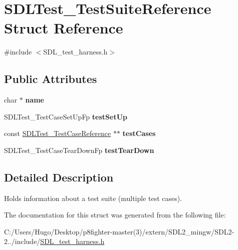 \hypertarget{struct_s_d_l_test___test_suite_reference}{}\section{S\+D\+L\+Test\+\_\+\+Test\+Suite\+Reference Struct Reference}
\label{struct_s_d_l_test___test_suite_reference}


{\ttfamily \#include $<$S\+D\+L\+\_\+test\+\_\+harness.\+h$>$}

\subsection*{Public Attributes}
\begin{DoxyCompactItemize}
\item 
\mbox{\label{struct_s_d_l_test___test_suite_reference_a8b002d932f91b321b384e59ae17f8f39}} 
char $\ast$ {\bfseries name}
\item 
\mbox{\label{struct_s_d_l_test___test_suite_reference_a8aa788b982efb93c93c2ab01202e0007}} 
S\+D\+L\+Test\+\_\+\+Test\+Case\+Set\+Up\+Fp {\bfseries test\+Set\+Up}
\item 
\mbox{\label{struct_s_d_l_test___test_suite_reference_a06d97ce5bcf9ceb1300cc4aa39c028d3}} 
const \hyperlink{struct_s_d_l_test___test_case_reference}{S\+D\+L\+Test\+\_\+\+Test\+Case\+Reference} $\ast$$\ast$ {\bfseries test\+Cases}
\item 
\mbox{\label{struct_s_d_l_test___test_suite_reference_ad66abaf20653fd7361d28c69f88ac702}} 
S\+D\+L\+Test\+\_\+\+Test\+Case\+Tear\+Down\+Fp {\bfseries test\+Tear\+Down}
\end{DoxyCompactItemize}


\subsection{Detailed Description}
Holds information about a test suite (multiple test cases). 

The documentation for this struct was generated from the following file\+:\begin{DoxyCompactItemize}
\item 
C\+:/\+Users/\+Hugo/\+Desktop/p8fighter-\/master(3)/extern/\+S\+D\+L2\+\_\+mingw/\+S\+D\+L2-\/2../include/\hyperlink{_s_d_l__test__harness_8h}{S\+D\+L\+\_\+test\+\_\+harness.\+h}\end{DoxyCompactItemize}
